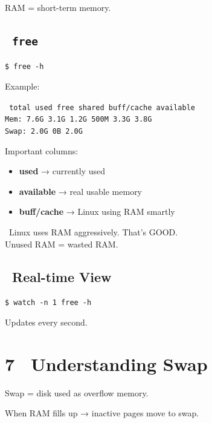 \documentclass[12pt]{article}
\newcommand{\swapicon}{\faArrowsAltH}      %
\newcommand{\warningicon}{\faExclamationTriangle}
\begin{document}
RAM = short-term memory.

\subsection*{\faBrain\ \texttt{free}}

\begin{highlightbox}
\texttt{\$ free -h}
\end{highlightbox}

Example:

\begin{highlightbox}
\texttt{              total   used   free  shared  buff/cache  available}\\
\texttt{Mem:           7.6G   3.1G   1.2G     500M     3.3G       3.8G}\\
\texttt{Swap:          2.0G   0B     2.0G}
\end{highlightbox}

Important columns:

\begin{itemize}
    \item \textbf{used} → currently used
    \item \textbf{available} → real usable memory
    \item \textbf{buff/cache} → Linux using RAM smartly
\end{itemize}

\begin{warningbox}
\warningicon\ Linux uses RAM aggressively. That's GOOD.\\
Unused RAM = wasted RAM.
\end{warningbox}

\subsection*{\faEye\ Real-time View}

\begin{highlightbox}
\texttt{\$ watch -n 1 free -h}
\end{highlightbox}

Updates every second.

\section*{7 \swapicon\ Understanding Swap}

Swap = disk used as overflow memory.

When RAM fills up → inactive pages move to swap.
\end{document}
